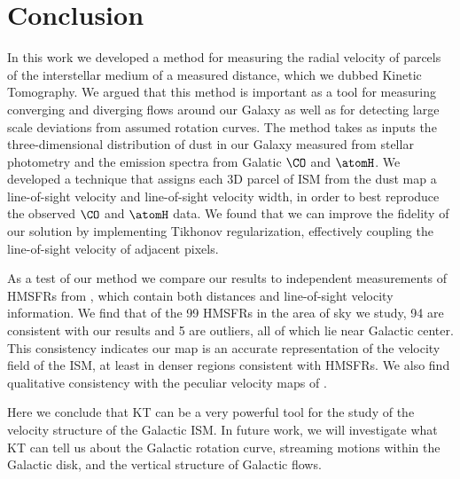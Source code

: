 \section{Conclusion}
\label{sec:conclusion}

In this work we developed a method for measuring the radial velocity of parcels of the interstellar medium of a measured distance, which we dubbed  Kinetic Tomography. We argued that this method is important as a tool for measuring converging and diverging flows around our Galaxy as well as for detecting large scale deviations from assumed rotation curves. The method takes as inputs the three-dimensional distribution of dust in our Galaxy measured from stellar photometry and the emission spectra from Galatic $\CO$ and $\atomH$. We developed a technique that assigns each 3D parcel of ISM from the dust map a line-of-sight velocity and line-of-sight velocity width, in order to best reproduce the observed $\CO$ and $\atomH$ data. We found that we can improve the fidelity of our solution by implementing Tikhonov regularization, effectively coupling the line-of-sight velocity of adjacent pixels. 

As a test of our method we compare our results to independent measurements of HMSFRs from \Reid{}, which contain both distances and line-of-sight velocity information. We find that of the 99 HMSFRs in the area of sky we study, 94 are consistent with our results and 5 are outliers, all of which lie near Galactic center. This consistency indicates our map is an accurate representation of the velocity field of the ISM, at least in denser regions consistent with HMSFRs. We also find qualitative consistency with the peculiar velocity maps of \citet{1993A&A...275...67B}. 

Here we conclude that KT can be a very powerful tool for the study of the velocity structure of the Galactic ISM. In future work, we will investigate what KT can tell us about the Galactic rotation curve, streaming motions within the Galactic disk, and the vertical structure of Galactic flows.


